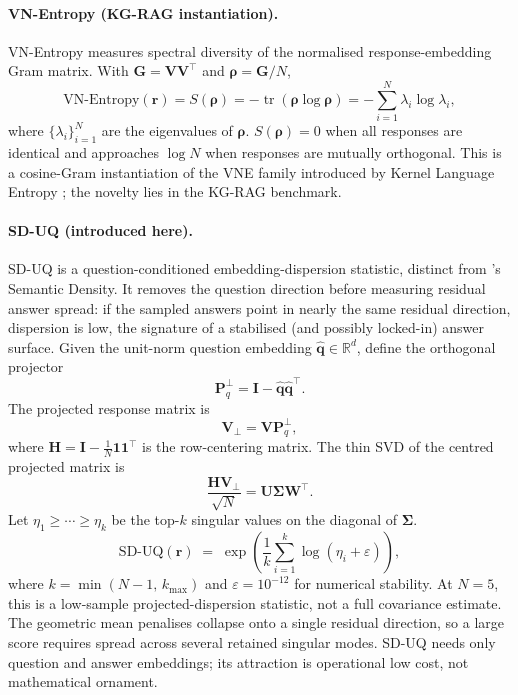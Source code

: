 \paragraph{VN-Entropy (KG-RAG instantiation).}
VN-Entropy measures spectral diversity of the normalised response-embedding
Gram matrix.
With $\bm{G}=\bm{V}\bm{V}^\top$ and $\bm{\rho}=\bm{G}/N$,
\begin{equation}
  \mathrm{VN\text{-}Entropy}(\bm{r}) = S(\bm{\rho})
  = -\operatorname{tr}(\bm{\rho}\log\bm{\rho})
  = -\textstyle\sum_{i=1}^{N} \lambda_i \log \lambda_i,
  \label{eq:vn_entropy}
\end{equation}
where $\{\lambda_i\}_{i=1}^N$ are the eigenvalues of $\bm{\rho}$.
$S(\bm{\rho}) = 0$ when all responses are identical and approaches $\log N$
when responses are mutually orthogonal.
This is a cosine-Gram instantiation of the VNE family introduced by Kernel
Language Entropy \citep{nikitin2024kernellanguageentropy}; the novelty lies in
the KG-RAG benchmark.


\paragraph{SD-UQ (introduced here).}
SD-UQ is a question-conditioned embedding-dispersion statistic, distinct from
\citet{qiu2024semanticdensity}'s Semantic Density.
It removes the question direction before measuring residual answer spread: if
the sampled answers point in nearly the same residual direction, dispersion is
low, the signature of a stabilised (and possibly locked-in) answer surface.
Given the unit-norm question embedding $\hat{\bm{q}}\in\mathbb{R}^d$, define
the orthogonal projector
\begin{equation}
  \bm{P}_{q}^{\perp}
  = \bm{I} - \hat{\bm{q}}\hat{\bm{q}}^\top.
\end{equation}
The projected response matrix is
\begin{equation}
  \bm{V}_{\perp} = \bm{V}\bm{P}_{q}^{\perp},
\end{equation}
where
$\bm{H} = \bm{I} - \frac{1}{N}\mathbf{1}\mathbf{1}^\top$
is the row-centering matrix.
The thin SVD of the centred projected matrix is
\begin{equation}
  \frac{\bm{H}\bm{V}_{\perp}}{\sqrt{N}}
  = \bm{U}\bm{\Sigma}\bm{W}^\top.
\end{equation}
Let $\eta_1 \geq \cdots \geq \eta_k$ be the top-$k$ singular values on
the diagonal of $\bm{\Sigma}$.
\begin{equation}
  \mathrm{SD\text{-}UQ}(\bm{r})
  \;=\;
  \exp\!\left(\frac{1}{k}\sum_{i=1}^{k} \log(\eta_i + \varepsilon)\right),
  \label{eq:sd_uq}
\end{equation}
where $k = \min(N{-}1,\, k_{\max})$ and $\varepsilon = 10^{-12}$ for
numerical stability.
At $N=5$, this is a low-sample projected-dispersion statistic, not a full
covariance estimate.
The geometric mean penalises collapse onto a single residual direction, so a
large score requires spread across several retained singular modes.
SD-UQ needs only question and answer embeddings; its attraction is operational
low cost, not mathematical ornament.

